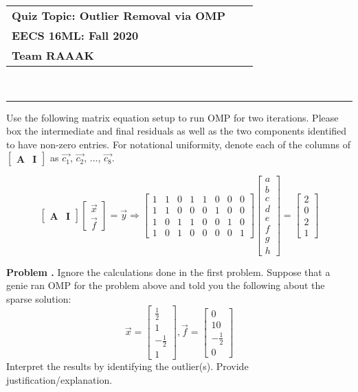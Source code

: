 \documentclass[11pt,letterpaper]{article}
\makeatletter
\newcommand{\class}{EECS 16ML}
\newcommand{\term}{Fall 2020}
\newcommand{\instructor}{Team RAAAK}
\newcommand{\head}[2]{%
\thispagestyle{empty}
\vspace*{-0.5in}
\noindent\begin{tabular*}{\textwidth}{l @{\extracolsep{\fill}} r @{\extracolsep{6pt}} l}
	\textbf{Quiz Topic: Outlier Removal via OMP} \\
	\textbf{\class:\; \term} & & \\
	\textbf{\instructor}
\end{tabular*} \\
\rule[2ex]{\textwidth}{2pt} %
}
\newcounter{problem}
\newcommand{\problem}{
	\stepcounter{problem}%
	\noindent \textbf{Problem \theproblem. }%
}
\makeatother
\begin{document}
\head{}


\problem Use the following matrix equation setup to run OMP for two iterations. Please box the intermediate and final residuals as well as the two components identified to have non-zero entries. For notational uniformity, denote each of the columns of 
$\begin{bmatrix}
        \boldsymbol{A} & \boldsymbol{I}
\end{bmatrix}$ 
as $\vec{c_{1}}$, $\vec{c_{2}}$, ..., $\vec{c_{8}}$.

\begin{equation*}
    \begin{bmatrix}
        \boldsymbol{A} & \boldsymbol{I}
    \end{bmatrix}\begin{bmatrix}
        \vec{x} \\
        \vec{f}
    \end{bmatrix}
     = \vec{y} \Rightarrow
    \begin{bmatrix}
         1 & 1 & 0 & 1 & 1 & 0 & 0 & 0 \\
         1 & 1 & 0 & 0 & 0 & 1 & 0 & 0 \\
         1 & 0 & 1 & 1 & 0 & 0 & 1 & 0 \\
         1 & 0 & 1 & 0 & 0 & 0 & 0 & 1
    \end{bmatrix}
    \begin{bmatrix}
         a \\ b \\ c \\ d \\ e \\ f \\ g \\ h
    \end{bmatrix}
    =\begin{bmatrix}
         2 \\ 0 \\ 2 \\ 1
    \end{bmatrix}
\end{equation*}
\vspace{9cm}

\problem Ignore the calculations done in the first problem. Suppose that a genie ran OMP for the problem above and told you the following about the sparse solution: %
\begin{equation*}
    \vec{x} = \begin{bmatrix}
        \frac{1}{2} \\ 1 \\ -\frac{1}{2} \\ 1
    \end{bmatrix}, \vec{f} = \begin{bmatrix}
        0 \\ 10 \\ -\frac{1}{2} \\ 0
    \end{bmatrix}
\end{equation*}
Interpret the results by identifying the outlier(s). Provide justification/explanation.
\newpage
\end{document}

